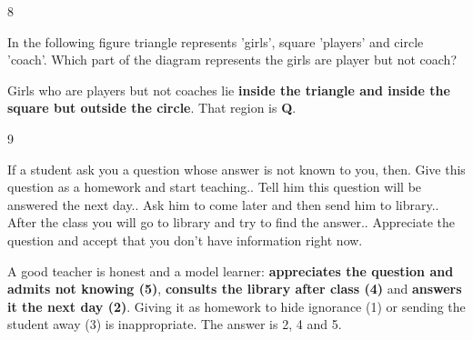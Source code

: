 \begin{question}{8}
{In the following figure triangle represents 'girls', square 'players' and circle 'coach'. Which part of the diagram represents the girls are player but not coach?\par}
\begin{explain}
Girls who are players but not coaches lie \textbf{inside the triangle and inside the square but outside the circle}. That region is \textbf{Q}.
\end{explain}
\end{question}

\begin{question}{9}
{If a student ask you a question whose answer is not known to you, then. Give this question as a homework and start teaching.. Tell him this question will be answered the next day.. Ask him to come later and then send him to library.. After the class you will go to library and try to find the answer.. Appreciate the question and accept that you don't have information right now.\par}
\begin{explain}
A good teacher is honest and a model learner: \textbf{appreciates the question and admits not knowing (5)}, \textbf{consults the library after class (4)} and \textbf{answers it the next day (2)}. Giving it as homework to hide ignorance (1) or sending the student away (3) is inappropriate. The answer is 2, 4 and 5.
\end{explain}
\end{question}

